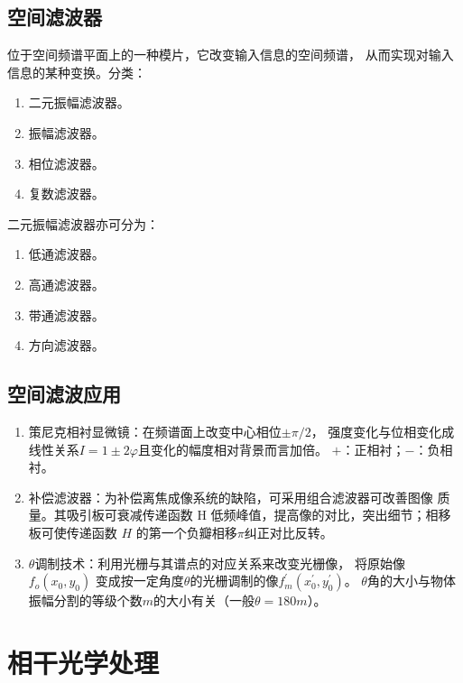 \documentclass[twocolumn]{ctexart}
\begin{document}
\subsection{空间滤波器}
位于空间频谱平面上的一种模片，它改变输入信息的空间频谱，
从而实现对输入信息的某种变换。分类：\par
\begin{enumerate}
    \item 二元振幅滤波器。
    \item 振幅滤波器。
    \item 相位滤波器。
    \item 复数滤波器。
\end{enumerate}
二元振幅滤波器亦可分为：
\begin{enumerate}
    \item 低通滤波器。
    \item 高通滤波器。
    \item 带通滤波器。
    \item 方向滤波器。
\end{enumerate}
\subsection{空间滤波应用}
\begin{enumerate}
    \item 策尼克相衬显微镜：在频谱面上改变中心相位$\pm \pi/2$，
    强度变化与位相变化成线性关系$I=1\pm 2\varphi$且变化的幅度相对背景而言加倍。
    $+$：正相衬；$-$：负相衬。
    \item 补偿滤波器：为补偿离焦成像系统的缺陷，可采用组合滤波器可改善图像
    质量。其吸引板可衰减传递函数 H 低频峰值，提高像的对比，突出细节；相移
    板可使传递函数 $H$ 的第一个负瓣相移$\pi$纠正对比反转。
    \item $\theta$调制技术：利用光栅与其谱点的对应关系来改变光栅像，
    将原始像$f_o\left(x_0,y_0\right)$ 变成按一定角度$\theta$的光栅调制的像$f^\prime_m\left(x^\prime _0,y^\prime _0\right)$。
    $\theta$角的大小与物体振幅分割的等级个数$m$的大小有关（一般$\theta = 180 m$）。
\end{enumerate}

\section{相干光学处理}
\end{document}
